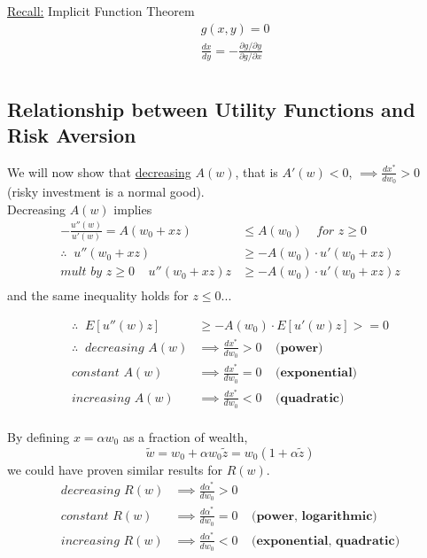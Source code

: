 \documentclass[
14pt,notheorems,hyperref={pdfauthor=whatever}
]{beamer}
\begin{document}
\begin{frame}
\underline{Recall:} Implicit Function Theorem\\
\begin{align*}
    &g(x,y) = 0\\
    &\frac{dx}{dy} = -\frac{\partial g / \partial y}{\partial g / \partial x}\\
\end{align*}
\end{frame}

\subsection{Relationship between Utility Functions and Risk Aversion}
\begin{frame}
We will now show that \underline{decreasing} $A(w)$, that is $A'(w) < 0$, $\implies \frac{dx^*}{dw_0}>0$ (risky investment is a normal good).\\
\hfill \break
Decreasing $A(w)$ implies
\begin{align*}
    -\frac{u''(w)}{u'(w)} = A(w_0+xz) &\leq A(w_0)\;\;\;\;\textit{for $z \geq 0$}\\
    \therefore \;\; u''(w_0+xz) &\geq -A(w_0)\cdot u'(w_0+xz)\\
    \textit{mult by $z \geq 0$} \;\;\;\; u''(w_0+xz)z &\geq -A(w_0)\cdot u'(w_0+xz)z\\
\end{align*}
and the same inequality holds for $z \leq 0$...
\end{frame}

\begin{frame}
\begin{align*}
    \therefore \;\; E[u''(w)z] &\geq -A(w_0)\cdot E[u'(w)z] >= 0\\
    \therefore \;\; \textit{decreasing }A(w) &\implies \frac{dx^*}{dw_0}>0 \;\;\;\;\textbf{(power)}\\
    \textit{constant }A(w) &\implies \frac{dx^*}{dw_0}=0 \;\;\;\;\textbf{(exponential)}\\
    \textit{increasing }A(w) &\implies \frac{dx^*}{dw_0}<0 \;\;\;\;\textbf{(quadratic)}\\
\end{align*}
\end{frame}

\begin{frame}
By defining $x = \alpha w_0$ as a fraction of wealth,
\[\tilde w = w_0 + \alpha w_0 \tilde z = w_0(1+\alpha \tilde z)\]
we could have proven similar results for $R(w)$.
\begin{align*}
    \textit{decreasing }R(w) &\implies \frac{d\alpha^*}{dw_0}>0\\
    \textit{constant }R(w) &\implies \frac{d\alpha^*}{dw_0}=0 \;\;\;\;\textbf{(power, logarithmic)}\\
    \textit{increasing }R(w) &\implies \frac{d\alpha^*}{dw_0}<0 \;\;\;\;\textbf{(exponential, quadratic)}\\
\end{align*}
\end{frame}
\end{document}
